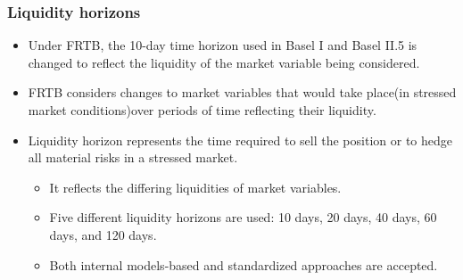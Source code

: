 \subsubsection{Liquidity horizons}
\begin{itemize}
\item Under FRTB, the 10-day time horizon used in Basel I and Basel II.5 is changed to reflect the liquidity of the market variable being considered.
\item FRTB considers changes to market variables that would take place(in stressed market conditions)over periods of time reflecting their liquidity.
\item Liquidity horizon represents the time required to sell the position or to hedge all material risks in a stressed market.
    \begin{itemize}
    \item It reflects the differing liquidities of market variables.
    \item Five different liquidity horizons are used: 10 days, 20 days, 40 days, 60 days, and 120 days.
    \item Both internal models-based and standardized approaches are accepted.
    \end{itemize}
\end{itemize}


